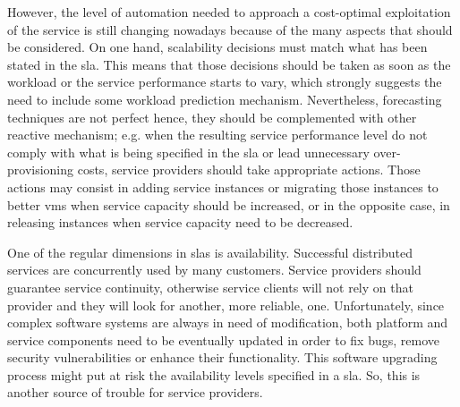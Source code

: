 However, the level of automation needed to approach a cost-optimal exploitation of the service is still
changing nowadays because of the many aspects that should be considered. On one hand, scalability
decisions must match what has been stated in the \ac{sla}. This means that those decisions should be
taken as soon as the workload or the service performance starts to vary, which strongly suggests the
need to include some workload prediction mechanism. Nevertheless, forecasting techniques are not perfect
hence, they should be complemented with other reactive mechanism; e.g. when the resulting service
performance level do not comply with what is being specified in the \ac{sla} or lead unnecessary
over-provisioning costs, service providers should take appropriate actions. Those actions may consist
in adding service instances or migrating those instances to better \ac{vm}s when service capacity
should be increased, or in the opposite case, in releasing instances when service capacity need to be
decreased.

One of the regular dimensions in \ac{sla}s is availability. Successful distributed services are
concurrently used by many customers. Service providers should guarantee service continuity, otherwise
service clients will not rely on that provider and they will look for another, more reliable, one.
Unfortunately, since complex software systems are always in need of modification, both platform and
service components need to be eventually updated in order to fix bugs, remove security vulnerabilities
or enhance their functionality. This software upgrading process might put at risk the availability levels
specified in a \ac{sla}. So, this is another source of trouble for service providers.

